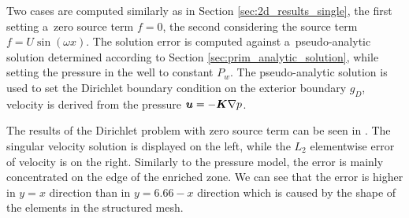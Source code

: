 Two cases are computed similarly as in Section \ref{sec:2d_results_single},
the first setting a~zero source term $f=0$,
the second considering the source term $f=U\sin(\omega x)$.
%
The solution error is computed against a~pseudo-analytic solution determined according to Section \ref{sec:prim_analytic_solution},
while setting the pressure in the well to constant $P_w$. The pseudo-analytic solution is used to set the Dirichlet boundary condition
on the exterior boundary $g_D$, velocity is derived from the pressure $\mathbf{\boldsymbol{u}}= -\mathbf{\boldsymbol{K}} \nabla p$.

The results of the Dirichlet problem with zero source term can be seen in .
The singular velocity solution is displayed on the left, while the $L_2$ elementwise error of velocity is on the right.
Similarly to the pressure model, the error is mainly concentrated on the edge of the enriched zone.
We can see that the error is higher in $y=x$ direction than in $y=6.66-x$ direction which is caused by the shape of the
elements in the structured mesh.

